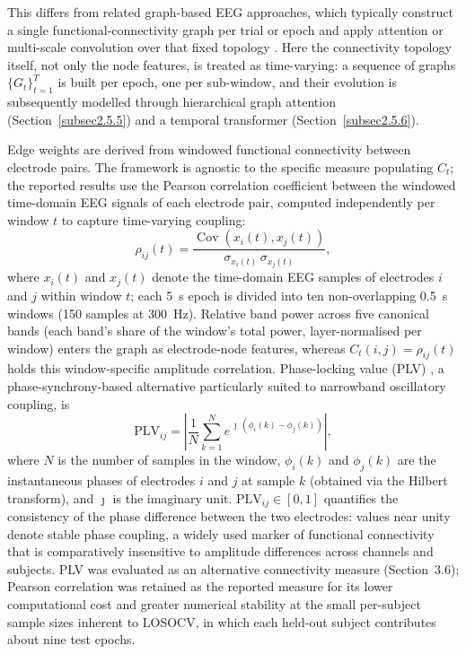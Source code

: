 \documentclass[pdflatex,sn-basic,Numbered]{sn-jnl}
\begin{document}
This differs from related graph-based EEG approaches, which typically construct a single functional-connectivity graph per trial or epoch and apply attention or multi-scale convolution over that fixed topology \cite{ref19,ref20,ref21,ref22}. Here the connectivity topology itself, not only the node features, is treated as time-varying: a sequence of graphs $\{G_t\}_{t=1}^{T}$ is built per epoch, one per sub-window, and their evolution is subsequently modelled through hierarchical graph attention (Section~\ref{subsec2.5.5}) and a temporal transformer (Section~\ref{subsec2.5.6}).

Edge weights are derived from windowed functional connectivity between electrode pairs. The framework is agnostic to the specific measure populating $C_t$; the reported results use the Pearson correlation coefficient between the windowed time-domain EEG signals of each electrode pair, computed independently per window $t$ to capture time-varying coupling:
\begin{equation}
\rho_{ij}(t) = \frac{\operatorname{Cov}\!\left(x_i(t), x_j(t)\right)}{\sigma_{x_i(t)}\,\sigma_{x_j(t)}}, \label{eq2pearson}
\end{equation}
where $x_i(t)$ and $x_j(t)$ denote the time-domain EEG samples of electrodes $i$ and $j$ within window $t$; each 5~s epoch is divided into ten non-overlapping 0.5~s windows (150 samples at 300~Hz). Relative band power across five canonical bands (each band's share of the window's total power, layer-normalised per window) enters the graph as electrode-node features, whereas $C_t(i,j)=\rho_{ij}(t)$ holds this window-specific amplitude correlation. Phase-locking value (PLV) \cite{ref37}, a phase-synchrony-based alternative particularly suited to narrowband oscillatory coupling, is
\begin{equation}
\mathrm{PLV}_{ij} = \left| \frac{1}{N}\sum_{k=1}^{N} e^{\,\jmath\,(\phi_i(k)-\phi_j(k))} \right|, \label{eq2}
\end{equation}
where $N$ is the number of samples in the window, $\phi_i(k)$ and $\phi_j(k)$ are the instantaneous phases of electrodes $i$ and $j$ at sample $k$ (obtained via the Hilbert transform), and $\jmath$ is the imaginary unit. $\mathrm{PLV}_{ij}\in[0,1]$ quantifies the consistency of the phase difference between the two electrodes: values near unity denote stable phase coupling, a widely used marker of functional connectivity that is comparatively insensitive to amplitude differences across channels and subjects. PLV was evaluated as an alternative connectivity measure (Section~3.6); Pearson correlation was retained as the reported measure for its lower computational cost and greater numerical stability at the small per-subject sample sizes inherent to LOSOCV, in which each held-out subject contributes about nine test epochs.
\end{document}
